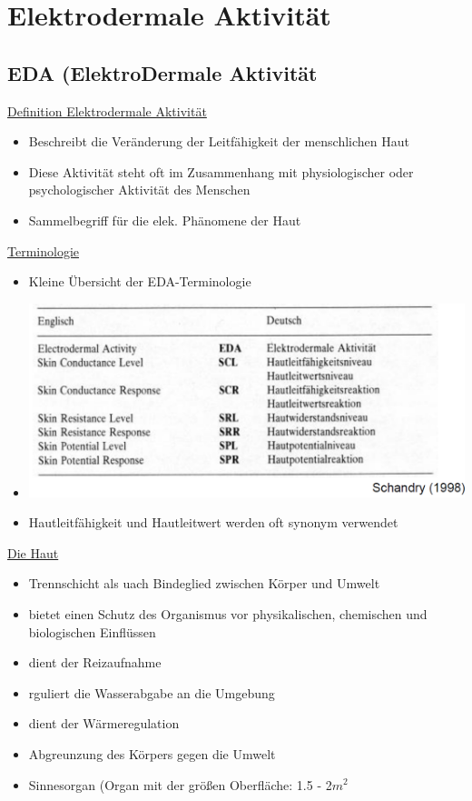 \documentclass[a4paper,10pt,oneside]{article}
\begin{document}
 		
\section{Elektrodermale Aktivität}
\subsection{EDA (ElektroDermale Aktivität}

\underline{Definition Elektrodermale Aktivität} \\
	\begin{itemize}
		\item Beschreibt die Veränderung der Leitfähigkeit der menschlichen Haut
		\item Diese Aktivität steht oft im Zusammenhang mit physiologischer oder psychologischer Aktivität des Menschen
		\item Sammelbegriff für die elek. Phänomene der Haut
	\end{itemize}
	
\underline{Terminologie} \\
	\begin{itemize}
		\item Kleine Übersicht der EDA-Terminologie
		\item[] \includegraphics[scale=0.2]{Grafiken/1706.png}
		\item Hautleitfähigkeit und Hautleitwert werden oft synonym verwendet
	\end{itemize}
	
\underline{Die Haut} \\
	\begin{itemize}
		\item Trennschicht als uach Bindeglied zwischen Körper und Umwelt
		\item bietet einen Schutz des Organismus vor physikalischen, chemischen und biologischen Einflüssen
		\item dient der Reizaufnahme
		\item rguliert die Wasserabgabe an die Umgebung
		\item dient der Wärmeregulation
		\item Abgreunzung des Körpers gegen die Umwelt
		\item Sinnesorgan (Organ mit der größen Oberfläche: 1.5 - 2$m^2$
	\end{itemize}
\end{document}

